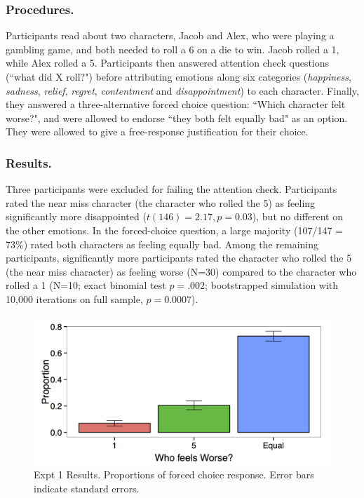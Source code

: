 \documentclass[10pt,letterpaper]{article}
\begin{document}
\subsubsection{Procedures.} Participants read about two characters, Jacob and Alex, who were playing a gambling game, and both needed to roll a 6 on a die to win. Jacob rolled a 1, while Alex rolled a 5. Participants then answered attention check questions (``what did X roll?") before attributing emotions along six categories (\textit{happiness}, \textit{sadness}, \textit{relief}, \textit{regret}, \textit{contentment} and \textit{disappointment})  to each character. Finally, they answered a three-alternative forced choice question: ``Which character felt worse?", and were allowed to endorse ``they both felt equally bad" as an option. They were allowed to give a free-response justification for their choice.

\subsubsection{Results.} Three participants were excluded for failing the attention check. Participants rated the near miss character (the character who rolled the 5) as feeling significantly more disappointed ($t(146)=2.17, p=0.03$), but no different on the other emotions. In the forced-choice question, a large majority (107/147 = 73\%) rated both characters as feeling equally bad. Among the remaining participants, significantly more participants rated the character who rolled the 5 (the near miss character) as feeling worse (N=30) compared to the character who rolled a 1 (N=10; exact binomial test $p=.002$; bootstrapped simulation with 10,000 iterations on full sample, $p=0.0007$).


\begin{figure}[htb!]
\includegraphics[width=\columnwidth]{images/Expt1results.png}
\caption{ Expt 1 Results. Proportions of forced choice response. Error bars indicate standard errors. }
\label{Expt1ResultFig}
\end{figure}
\end{document}

